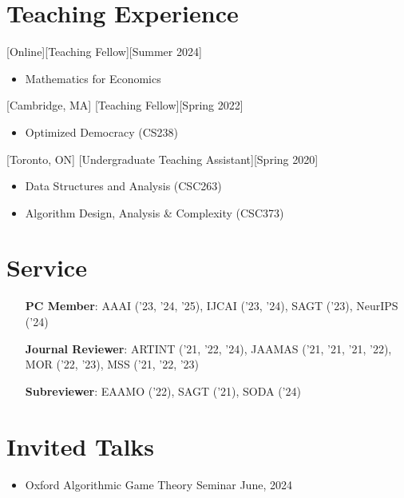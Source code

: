 \documentclass{article}
\begin{document}
    
    \section{Teaching Experience}
    [Online][Teaching Fellow][Summer 2024]
    \begin{itemize}
    	\item Mathematics for Economics
    \end{itemize}
    [Cambridge, MA]
    [Teaching Fellow][Spring 2022]
    \begin{itemize}
        \item Optimized Democracy (CS238)
    \end{itemize}
    
    [Toronto, ON]
    [Undergraduate Teaching Assistant][Spring 2020]
    \begin{itemize}
        \item Data Structures and Analysis (CSC263)
        \item Algorithm Design, Analysis \& Complexity (CSC373)
    \end{itemize}
    
    \section{Service}
    \begin{enumerate}[align=left]
    	\item[\textbf{PC Member}:] AAAI ('23, '24, '25), IJCAI ('23, '24), SAGT ('23), NeurIPS ('24)
    	\item[\textbf{Journal Reviewer}:] ARTINT ('21, '22, '24), JAAMAS ('21, '21, '21, '22), MOR ('22, '23), MSS ('21, '22, '23)
    	\item[\textbf{Subreviewer}:] EAAMO ('22), SAGT ('21), SODA ('24)
    \end{enumerate}
    
    
    \section{Invited Talks}
    \begin{itemize}
    	\item Oxford Algorithmic Game Theory Seminar \hfill June, 2024	
    \end{itemize}
\end{document}
